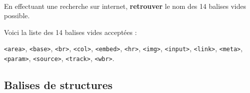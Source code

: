 \documentclass[a4paper,17pt]{extarticle}
\newenvironment{eleve}%
{\begin{activite}\color{noiramu}\\}
{\end{activite}}
\begin{document}
\begin{eleve}
    En effectuant une recherche sur internet, \textbf{retrouver} le nom des
14 balises vides possible.
        
        \end{eleve}\begin{reponse}
    Voici la liste des 14 balises vides acceptées :

\texttt{\textless{}area\textgreater{}},
\texttt{\textless{}base\textgreater{}},
\texttt{\textless{}br\textgreater{}},
\texttt{\textless{}col\textgreater{}},
\texttt{\textless{}embed\textgreater{}},
\texttt{\textless{}hr\textgreater{}},
\texttt{\textless{}img\textgreater{}},
\texttt{\textless{}input\textgreater{}},
\texttt{\textless{}link\textgreater{}},
\texttt{\textless{}meta\textgreater{}},
\texttt{\textless{}param\textgreater{}},
\texttt{\textless{}source\textgreater{}},
\texttt{\textless{}track\textgreater{}},
\texttt{\textless{}wbr\textgreater{}}.

            \end{reponse}
    \hypertarget{balises-de-structures}{%
\subsection{Balises de structures}\label{balises-de-structures}}
\end{document}
